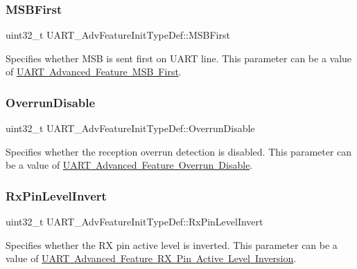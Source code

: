 \subsubsection{\texorpdfstring{MSBFirst}{MSBFirst}}
{\footnotesize\ttfamily uint32\+\_\+t U\+A\+R\+T\+\_\+\+Adv\+Feature\+Init\+Type\+Def\+::\+M\+S\+B\+First}

Specifies whether M\+SB is sent first on U\+A\+RT line. This parameter can be a value of \mbox{\hyperlink{group___u_a_r_t___m_s_b___first}{U\+A\+RT Advanced Feature M\+SB First}}. \mbox{\label{struct_u_a_r_t___adv_feature_init_type_def_af2079d3cf82744589352950855551bbb}} 
\subsubsection{\texorpdfstring{OverrunDisable}{OverrunDisable}}
{\footnotesize\ttfamily uint32\+\_\+t U\+A\+R\+T\+\_\+\+Adv\+Feature\+Init\+Type\+Def\+::\+Overrun\+Disable}

Specifies whether the reception overrun detection is disabled. This parameter can be a value of \mbox{\hyperlink{group___u_a_r_t___overrun___disable}{U\+A\+RT Advanced Feature Overrun Disable}}. \mbox{\label{struct_u_a_r_t___adv_feature_init_type_def_a85fecac9f89ae9916dbfde4689a3bc9b}} 
\subsubsection{\texorpdfstring{RxPinLevelInvert}{RxPinLevelInvert}}
{\footnotesize\ttfamily uint32\+\_\+t U\+A\+R\+T\+\_\+\+Adv\+Feature\+Init\+Type\+Def\+::\+Rx\+Pin\+Level\+Invert}

Specifies whether the RX pin active level is inverted. This parameter can be a value of \mbox{\hyperlink{group___u_a_r_t___rx___inv}{U\+A\+RT Advanced Feature RX Pin Active Level Inversion}}. \mbox{\label{struct_u_a_r_t___adv_feature_init_type_def_a1bc32023897ca98005319c4de7b84a1f}} 
